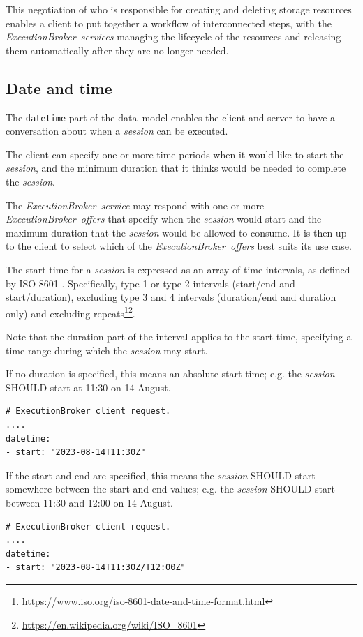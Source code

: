 \documentclass[11pt,a4paper]{ivoa}
\newcommand{\datamodel} {data~model}
\newcommand{\execbrokerservice}[1] {\textit{ExecutionBroker~service#1}}
\newcommand{\execoffer}[1] {\textit{ExecutionBroker~offer#1}}
\newcommand{\workerjob}[1] {\textit{session#1}}
\newcommand{\codeword}[1] {\texttt{#1}}
\newcommand{\footurl}[1] {\footnote{\url{#1}}}
\begin{document}
This negotiation of who is responsible for creating and deleting storage resources
enables a client to put together a workflow of interconnected steps, with the
\execbrokerservice{s}
managing the lifecycle of the resources and releasing them automatically after they
are no longer needed.

\subsection{Date and time}
\label{sub-date-time}

The \codeword{datetime} part of the \datamodel{} enables the client and server to have a
conversation about when a \workerjob{} can be executed.

The client can specify one or more time periods when it would like to start the \workerjob{},
and the minimum duration that it thinks would be needed to complete the \workerjob{}.

The \execbrokerservice{} may respond with one or more \execoffer{s} that specify when the \workerjob{}
would start and the maximum duration that the \workerjob{} would be allowed to consume.
It is then up to the client to select which of the \execoffer{s} best suits its use case.

The start time for a \workerjob{} is expressed as an array of time intervals, as defined by
ISO 8601 \citep{std:iso8601}.
Specifically, type 1 or type 2 intervals (start/end and start/duration), excluding type 3 and 4 intervals
(duration/end and duration only) and excluding
repeats\footurl{https://www.iso.org/iso-8601-date-and-time-format.html}\footurl{https://en.wikipedia.org/wiki/ISO_8601}.

Note that the duration part of the interval applies to the start time, specifying a
time range during which the \workerjob{} may start.

If no duration is specified, this means an absolute start time;
e.g. the \workerjob{} SHOULD start at 11:30 on 14 August.
\begin{lstlisting}[]
# ExecutionBroker client request.
....
datetime:
- start: "2023-08-14T11:30Z"
\end{lstlisting}

If the start and end are specified, this means the \workerjob{} SHOULD start somewhere between
the start and end values;
e.g. the \workerjob{} SHOULD start between 11:30 and 12:00 on 14 August.
\begin{lstlisting}[]
# ExecutionBroker client request.
....
datetime:
- start: "2023-08-14T11:30Z/T12:00Z"
\end{lstlisting}
\end{document}
